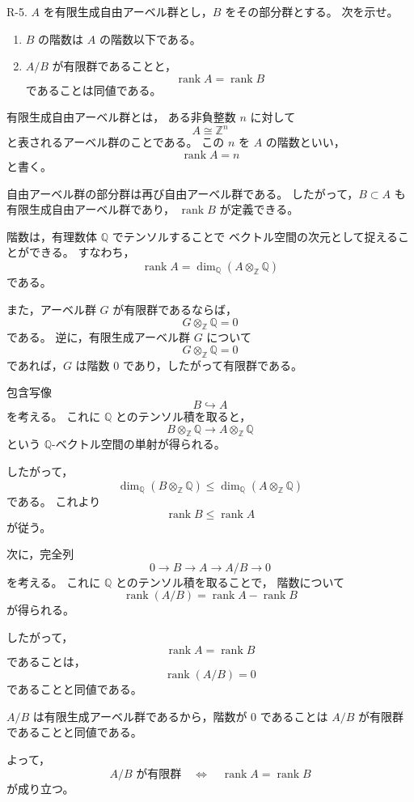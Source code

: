
\begin{exercise}
	R-5. $A$ を有限生成自由アーベル群とし，$B$ をその部分群とする。
	次を示せ。
	\begin{enumerate}
		\item $B$ の階数は $A$ の階数以下である。
		\item $A/B$ が有限群であることと，
		\[
		\operatorname{rank} A=\operatorname{rank} B
		\]
		であることは同値である。
	\end{enumerate}
\end{exercise}

\begin{background}
	有限生成自由アーベル群とは，
	ある非負整数 $n$ に対して
	\[
	A\cong \mathbb{Z}^n
	\]
	と表されるアーベル群のことである。
	この $n$ を $A$ の階数といい，
	\[
	\operatorname{rank}A=n
	\]
	と書く。
	
	自由アーベル群の部分群は再び自由アーベル群である。
	したがって，$B\subset A$ も有限生成自由アーベル群であり，
	$\operatorname{rank}B$ が定義できる。
	
	階数は，有理数体 $\mathbb{Q}$ でテンソルすることで
	ベクトル空間の次元として捉えることができる。
	すなわち，
	\[
	\operatorname{rank}A
	=
	\dim_{\mathbb{Q}}(A\otimes_{\mathbb{Z}}\mathbb{Q})
	\]
	である。
	
	また，アーベル群 $G$ が有限群であるならば，
	\[
	G\otimes_{\mathbb{Z}}\mathbb{Q}=0
	\]
	である。
	逆に，有限生成アーベル群 $G$ について
	\[
	G\otimes_{\mathbb{Z}}\mathbb{Q}=0
	\]
	であれば，$G$ は階数 $0$ であり，したがって有限群である。
\end{background}

\begin{strategy}
	包含写像
	\[
	B\hookrightarrow A
	\]
	を考える。
	これに $\mathbb{Q}$ とのテンソル積を取ると，
	\[
	B\otimes_{\mathbb{Z}}\mathbb{Q}
	\longrightarrow
	A\otimes_{\mathbb{Z}}\mathbb{Q}
	\]
	という $\mathbb{Q}$-ベクトル空間の単射が得られる。
	
	したがって，
	\[
	\dim_{\mathbb{Q}}(B\otimes_{\mathbb{Z}}\mathbb{Q})
	\leq
	\dim_{\mathbb{Q}}(A\otimes_{\mathbb{Z}}\mathbb{Q})
	\]
	である。
	これより
	\[
	\operatorname{rank}B\leq \operatorname{rank}A
	\]
	が従う。
	
	次に，完全列
	\[
	0\longrightarrow B\longrightarrow A\longrightarrow A/B\longrightarrow 0
	\]
	を考える。
	これに $\mathbb{Q}$ とのテンソル積を取ることで，
	階数について
	\[
	\operatorname{rank}(A/B)
	=
	\operatorname{rank}A-\operatorname{rank}B
	\]
	が得られる。
	
	したがって，
	\[
	\operatorname{rank}A=\operatorname{rank}B
	\]
	であることは，
	\[
	\operatorname{rank}(A/B)=0
	\]
	であることと同値である。
	
	$A/B$ は有限生成アーベル群であるから，階数が $0$ であることは
	$A/B$ が有限群であることと同値である。
	
	よって，
	\[
	A/B\text{ が有限群}
	\quad\Longleftrightarrow\quad
	\operatorname{rank}A=\operatorname{rank}B
	\]
	が成り立つ。
\end{strategy}